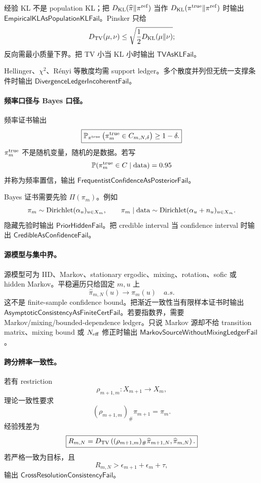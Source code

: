 经验 KL 不是 population KL；把 \(D_{\rm KL}(\widehat\pi\|\pi^{\rm ref})\) 当作 \(D_{\rm KL}(\pi^{\rm true}\|\pi^{\rm ref})\) 时输出 \(\mathsf{EmpiricalKLAsPopulationKLFail}\)。Pinsker 只给
\[
D_{\rm TV}(\mu,\nu)
\le
\sqrt{\frac12D_{\rm KL}(\mu\|\nu)};
\]
反向需最小质量下界。把 TV 小当 KL 小时输出 \(\mathsf{TVAsKLFail}\)。

Hellinger、\(\chi^2\)、Rényi 等散度均需 support ledger。多个散度并列但无统一支撑条件时输出 \(\mathsf{DivergenceLedgerIncoherentFail}\)。

\paragraph{频率口径与 Bayes 口径。}
频率证书输出
\[
\boxed{
\mathbb P_{\pi^{\rm true}}
\left(
\pi_m^{\rm true}\in C_{m,N,\delta}
\right)
\ge
1-\delta.
}
\]
\(\pi_m^{\rm true}\) 不是随机变量，随机的是数据。若写
\[
\mathbb P(\pi_m^{\rm true}\in C\mid{\rm data})=0.95
\]
并称为频率置信，输出 \(\mathsf{FrequentistConfidenceAsPosteriorFail}\)。

Bayes 证书需要先验 \(\Pi(\pi_m)\)。例如
\[
\pi_m\sim{\rm Dirichlet}(\alpha_u)_{u\in X_m},
\qquad
\pi_m\mid{\rm data}\sim{\rm Dirichlet}(\alpha_u+n_u)_{u\in X_m}.
\]
隐藏先验时输出 \(\mathsf{PriorHiddenFail}\)。把 credible interval 当 confidence interval 时输出 \(\mathsf{CredibleAsConfidenceFail}\)。

\paragraph{源模型与集中界。}
源模型可为 IID、Markov、stationary ergodic、mixing、rotation、sofic 或 hidden Markov。平稳遍历只给固定 \(m,u\) 上
\[
\widehat\pi_{m,N}(u)\to\pi_m(u)\quad a.s.
\]
这不是 finite-sample confidence bound。把渐近一致性当有限样本证书时输出 \(\mathsf{AsymptoticConsistencyAsFiniteCertFail}\)。若要指数界，需要 Markov/mixing/bounded-dependence ledger。只说 Markov 源却不给 transition matrix、mixing bound 或 \(N_{\rm eff}\) 修正时输出 \(\mathsf{MarkovSourceWithoutMixingLedgerFail}\)。

\paragraph{跨分辨率一致性。}
若有 restriction
\[
\rho_{m+1,m}:X_{m+1}\to X_m,
\]
理论一致性要求
\[
\boxed{
(\rho_{m+1,m})_\#\pi_{m+1}=\pi_m.
}
\]
经验残差为
\[
\boxed{
R_{m,N}
=
D_{\rm TV}
\left(
(\rho_{m+1,m})_\#\widehat\pi_{m+1,N},
\widehat\pi_{m,N}
\right).
}
\]
若严格一致为目标，且
\[
R_{m,N}>\epsilon_{m+1}+\epsilon_m+\tau,
\]
输出 \(\mathsf{CrossResolutionConsistencyFail}\)。

